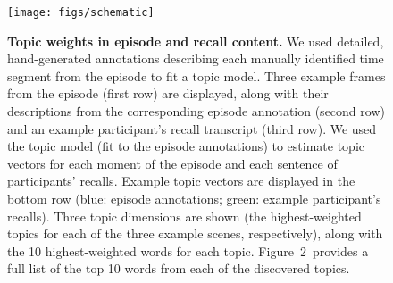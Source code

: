 \documentclass[10pt]{article}
\renewcommand{\includegraphics}[2][]{} %
\newcommand{\topics}{2} %
\providecommand{\DIFaddtex}[1]{{\protect\color{blue}\uwave{#1}}} %
\providecommand{\DIFaddFL}[1]{\DIFadd{#1}} %
\providecommand{\DIFaddbeginFL}{} %
\providecommand{\DIFaddendFL}{} %
\providecommand{\DIFadd}[1]{\texorpdfstring{\DIFaddtex{#1}}{#1}} %
\newcommand{\DIFaddincludegraphics}[2][]{{\color{blue}\fbox{\DIFOincludegraphics[#1]{#2}}}} %
\DeclareRobustCommand{\DIFaddbeginFL}{\DIFOaddbeginFL \let\includegraphics\DIFaddincludegraphics} %
\DeclareRobustCommand{\DIFaddendFL}{\DIFOaddendFL \let\includegraphics\DIFOincludegraphics} %
\begin{document}
\begin{figure}
[tp]
\centering
\texttt{[image: figs/schematic]}
\caption{\small \textbf{Topic weights in episode and recall content.} We used detailed, hand-generated annotations describing each manually identified time segment from the episode to fit a topic model.  Three example frames from the episode (first row) are displayed, along with their descriptions from the corresponding episode annotation (second row) and an example participant's recall transcript (third row).  We used the topic model (fit to the episode annotations) to estimate topic vectors for each moment of the episode and each sentence of participants' recalls.  Example topic vectors are displayed in the bottom row (blue: episode annotations; green: example participant's recalls).  Three topic dimensions are shown (the highest-weighted topics for each of the three example scenes, respectively), along with the 10 highest-weighted words for each topic.  \DIFaddbeginFL \DIFaddFL{Supplementary }\DIFaddendFL Figure~\topics~provides a full list of the top 10 words from each of the discovered topics.}
\label{fig:schematic}

\end{figure}
\end{document}
